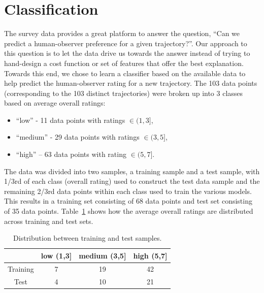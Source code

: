 \documentclass[letterpaper, 10 pt, conference]{ieeeconf}  %
\begin{document}
\section{Classification}
\label{sec:classification}
The survey data provides a great platform to answer the question, ``Can we predict a human-observer preference for a given trajectory?''. Our approach to this question is to let the data drive us towards the answer instead of trying to hand-design a cost function or set of features that offer the best explanation. Towards this end, we chose to learn a classifier based on the available data to help predict the human-observer rating for a new trajectory. The 103 data points (corresponding to the 103 distinct trajectories) were broken up into 3 classes based on average overall ratings:
\begin{itemize}
\item “low” - 11 data points with ratings $\in (1,3]$,
\item “medium”  - 29 data points with ratings $\in (3,5]$,
\item “high” – 63 data points with rating $\in (5,7]$.
\end{itemize}
The data was divided into two samples, a training sample and a test sample, with 1/3rd of each class (overall rating) used to construct the test data sample and the remaining 2/3rd data points within each class used to train the various models. This results in a training set consisting of 68 data points and test set consisting of 35 data points. Table~\ref{tab:test_training} shows how the average overall ratings are distributed across training and test sets.
\begin{table}[h]
\begin{centering}
\begin{tabular}{|c|c|c|c|}
\hline
 & low (1,3] & medium (3,5] & high (5,7] \\ \hline
Training & 7 & 19 & 42 \\ \hline
Test & 4 & 10 & 21 \\ \hline
\end{tabular}
\caption{Distribution between training and test samples.}
\label{tab:test_training}
\end{centering}
\end{table}
\end{document}
